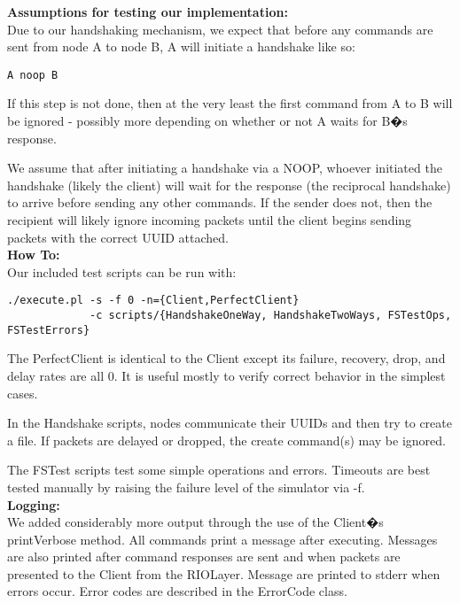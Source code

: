 \documentclass[11pt]{article}
\begin{document}
\textbf{Assumptions for testing our implementation:} \\

Due to our handshaking mechanism, we expect that before any commands are sent from node A to node B, A will initiate a handshake like so:

\begin{verbatim}
A noop B
\end{verbatim}

If this step is not done, then at the very least the first command from A to B will be ignored - possibly more depending on whether or not A waits for B�s response.

We assume that after initiating a handshake via a NOOP, whoever initiated the handshake (likely the client) will wait for the response (the reciprocal handshake) to arrive before sending any other commands. If the sender does not, then the recipient will likely ignore incoming packets until the client begins sending packets with the correct UUID attached. \\

\textbf{How To:} \\

Our included test scripts can be run with:

\begin{verbatim}
./execute.pl -s -f 0 -n={Client,PerfectClient} 
             -c scripts/{HandshakeOneWay, HandshakeTwoWays, FSTestOps, FSTestErrors}
\end{verbatim}

The PerfectClient is identical to the Client except its failure, recovery, drop, and delay rates are all 0. It is useful mostly to verify correct behavior in the simplest cases.

In the Handshake scripts, nodes communicate their UUIDs and then try to create a file. If packets are delayed or dropped, the create command(s) may be ignored.

The FSTest scripts test some simple operations and errors. Timeouts are best tested manually by raising the failure level of the simulator via -f. \\

\textbf{Logging:} \\

We added considerably more output through the use of the Client�s printVerbose method. All commands print a message after executing. Messages are also printed after command responses are sent and when packets are presented to the Client from the RIOLayer. Message are printed to stderr when errors occur. Error codes are described in the ErrorCode class.
\end{document}
